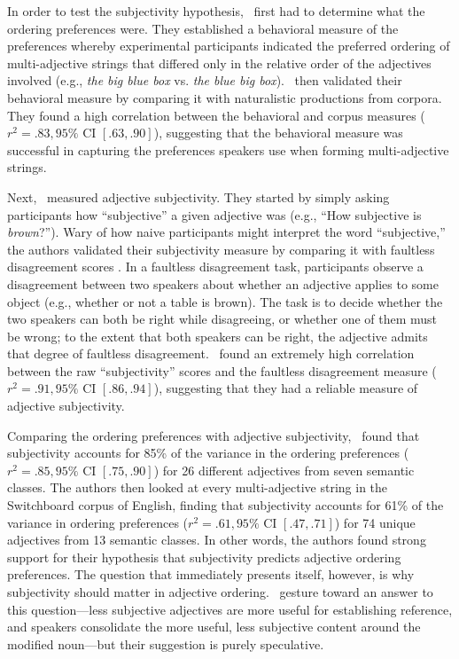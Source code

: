 \documentclass[10pt,a4paper]{article}
\begin{document}
In order to test the subjectivity hypothesis, \citeauthor{scontrasetal2017adjectives}~first had to determine what the ordering preferences were. They established a behavioral measure of the preferences whereby experimental participants indicated the preferred ordering of multi-adjective strings that differed only in the relative order of the adjectives involved (e.g., \emph{the big blue box} vs. \emph{the blue big box}). \citeauthor{scontrasetal2017adjectives}~then validated their behavioral measure by comparing it with naturalistic productions from corpora. They found a high correlation between the behavioral and corpus measures ($r^{2}=.83, 95\%$ CI $[.63, .90]$), suggesting that the behavioral measure was successful in capturing the preferences speakers use when forming multi-adjective strings.

Next, \citeauthor{scontrasetal2017adjectives}~measured adjective subjectivity. They started by simply asking participants how ``subjective'' a given adjective was (e.g., ``How subjective is \emph{brown}?''). Wary of how naive participants might interpret the word ``subjective,'' the authors validated their subjectivity measure by comparing it with faultless disagreement scores \cite{kolbel2004,barker2013,kennedy2013,macfarlane2014}. In a faultless disagreement task, participants observe a disagreement between two speakers about whether an adjective applies to some object (e.g., whether or not a table is brown). The task is to decide whether the two speakers can both be right while disagreeing, or whether one of them must be wrong; to the extent that both speakers can be right, the adjective admits that degree of faultless disagreement. \citeauthor{scontrasetal2017adjectives}~found an extremely high correlation between the raw ``subjectivity'' scores and the faultless disagreement measure ($r^{2}=.91, 95\%$ CI $[.86, .94]$), suggesting that they had a reliable measure of adjective subjectivity.

Comparing the ordering preferences with adjective subjectivity, \citeauthor{scontrasetal2017adjectives}~found that subjectivity accounts for 85\% of the variance in the ordering preferences ($r^{2}=.85, 95\%$ CI $[.75, .90]$) for 26 different adjectives from seven semantic classes. The authors then looked at every multi-adjective string in the Switchboard corpus of English, finding that subjectivity accounts for 61\% of the variance in ordering preferences ($r^{2}=.61, 95\%$ CI $[.47, .71]$) for 74 unique adjectives from 13 semantic classes. In other words, the authors found strong support for their hypothesis that subjectivity predicts adjective ordering preferences. The question that immediately presents itself, however, is why subjectivity should matter in adjective ordering. \citeauthor{scontrasetal2017adjectives}~gesture toward an answer to this question---less subjective adjectives are more useful for establishing reference, and speakers consolidate the more useful, less subjective content around the modified noun---but their suggestion is purely speculative.
\end{document}

